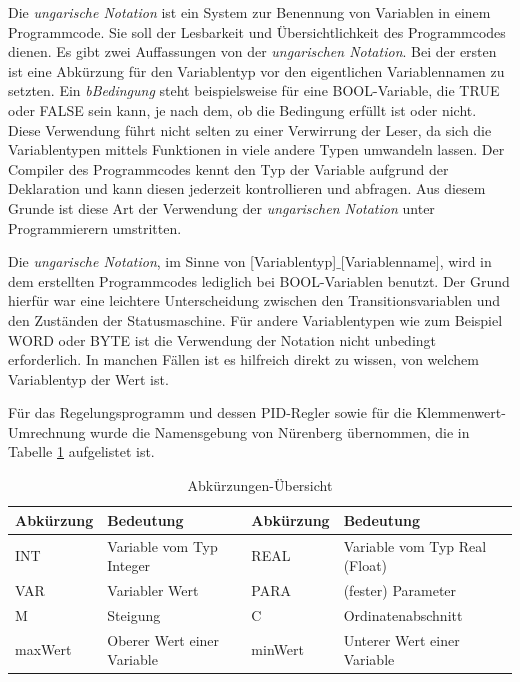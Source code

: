 Die \textit{ungarische Notation} ist ein System zur Benennung von Variablen in einem Programmcode. Sie soll der Lesbarkeit und Übersichtlichkeit des Programmcodes dienen. Es gibt zwei Auffassungen von der \textit{ungarischen Notation}. Bei der ersten ist eine Abkürzung für den Variablentyp vor den eigentlichen Variablennamen zu setzten. Ein \textit{bBedingung} steht beispielsweise für eine BOOL-Variable, die TRUE oder FALSE sein kann, je nach dem, ob die Bedingung erfüllt ist oder nicht. Diese Verwendung führt nicht selten zu einer Verwirrung der Leser,  da sich die Variablentypen mittels Funktionen in viele andere Typen umwandeln lassen. Der Compiler des Programmcodes kennt den Typ der Variable aufgrund der Deklaration und kann diesen jederzeit kontrollieren und abfragen. Aus diesem Grunde ist diese Art der Verwendung der \textit{ungarischen Notation} unter Programmierern umstritten. 

Die \textit{ungarische Notation}, im Sinne von [Variablentyp]$\_$[Variablenname], wird in dem erstellten Programmcodes lediglich bei BOOL-Variablen benutzt. Der Grund hierfür war eine leichtere Unterscheidung zwischen den Transitionsvariablen und den Zuständen der Statusmaschine. Für andere Variablentypen wie zum Beispiel WORD oder BYTE ist die Verwendung der Notation nicht unbedingt erforderlich. In manchen Fällen ist es hilfreich direkt zu wissen, von welchem Variablentyp der Wert ist. 

Für das Regelungsprogramm und dessen PID-Regler sowie für die Klemmenwert-Umrechnung wurde die Namensgebung von Nürenberg \citep{Nuerenberg2015} übernommen, die in Tabelle \ref{tab:Namenskonzept Nuerenberg} aufgelistet ist. 



\begin{table}[htb]
\centering
\caption{Abkürzungen-Übersicht \citep{Nuerenberg2015}}\vspace{6pt}
\begin{tabular}{llll}
\hline 
\rule[-1ex]{0pt}{2.5ex} \textbf{Abkürzung} & \textbf{Bedeutung} & \textbf{Abkürzung} & \textbf{Bedeutung} \\ 
\hline
\hline  
\rule[-1ex]{0pt}{2.5ex} INT & Variable vom Typ Integer & REAL & Variable vom Typ Real (Float) \\ 
\hline 
\rule[-1ex]{0pt}{2.5ex} VAR & Variabler Wert & PARA & (fester) Parameter \\ 
\hline 
\rule[-1ex]{0pt}{2.5ex} M & Steigung & C & Ordinatenabschnitt \\ 
\hline 
\rule[-1ex]{0pt}{2.5ex} maxWert & Oberer Wert einer Variable & minWert & Unterer Wert einer Variable \\ 
\hline 
\hline
\end{tabular} 
\label{tab:Namenskonzept Nuerenberg}
\end{table}

